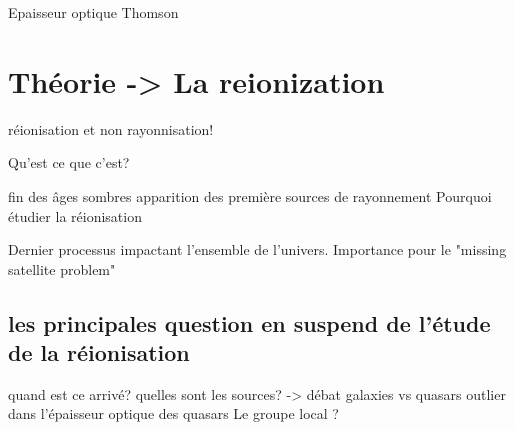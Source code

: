 Epaisseur optique Thomson

\section{Théorie -> La reionization}

réionisation et non rayonnisation!

Qu'est ce que c'est?

fin des âges sombres
apparition des première sources de rayonnement
Pourquoi étudier la réionisation

Dernier processus impactant l'ensemble de l'univers.
Importance pour le "missing satellite problem"

\subsection{les principales question en suspend de l'étude de la réionisation}

quand est ce arrivé?
quelles sont les sources? -> débat galaxies vs quasars
outlier dans l'épaisseur optique des quasars
Le groupe local ?



